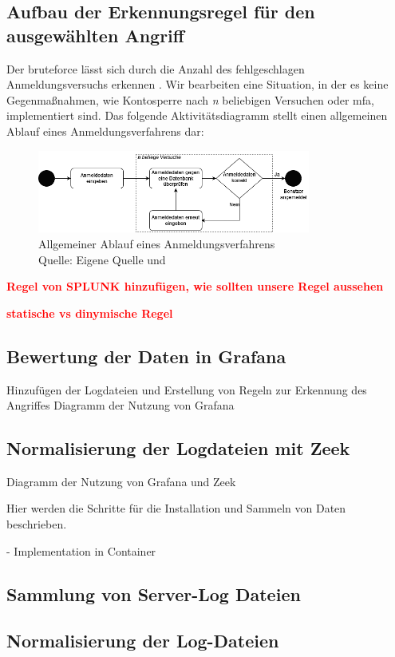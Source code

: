 \subsection{Aufbau der Erkennungsregel für den ausgewählten Angriff}
Der \gls{bruteforce} lässt sich durch die Anzahl des fehlgeschlagen Anmeldungsversuchs erkennen \citep{Selvaganesh_SplunkBruteForce}. Wir bearbeiten eine Situation, in der es keine Gegenmaßnahmen, wie Kontosperre nach \textit{n} beliebigen Versuchen oder \gls{mfa}, implementiert sind. Das folgende Aktivitätsdiagramm stellt einen allgemeinen Ablauf eines Anmeldungsverfahrens dar:

\begin{figure}[H]
   \centering
   \includegraphics[width=0.8\textwidth]{assets/Anmeldeverfahren.drawio.png}
   \caption{Allgemeiner Ablauf eines Anmeldungsverfahrens \\Quelle: Eigene Quelle und \citep{Selvaganesh_SplunkBruteForce}}
   \centering
\end{figure}

\textcolor{red}{\textbf{Regel von SPLUNK hinzufügen, wie sollten unsere Regel aussehen}}

\textcolor{red}{\textbf{statische vs dinymische Regel}}





\subsection{Bewertung der Daten in Grafana}
Hinzufügen der Logdateien und Erstellung von Regeln zur Erkennung des Angriffes
Diagramm der Nutzung von Grafana

\subsection{Normalisierung der Logdateien mit Zeek}
Diagramm der Nutzung von Grafana und Zeek

Hier werden die Schritte für die Installation und Sammeln von Daten beschrieben.

- Implementation in Container %


\subsection{Sammlung von Server-Log Dateien}

\subsection{Normalisierung der Log-Dateien}





